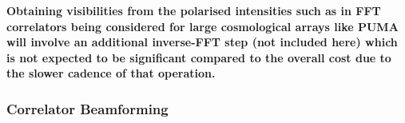 \documentclass[
  journal=pasa,
  manuscript=article-type,
  year=2020,
  volume=37,
]{cup-journal}
\begin{document}
\textbf{Obtaining visibilities from the polarised intensities such as in FFT correlators being considered for large cosmological arrays like PUMA will involve an additional inverse-FFT step (not included here) which is not expected to be significant compared to the overall cost due to the slower cadence of that operation.}


\subsubsection{Correlator Beamforming}
\end{document}
